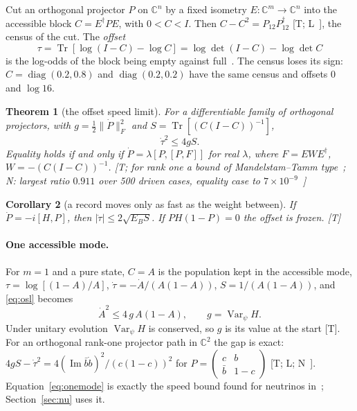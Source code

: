 \documentclass[11pt]{article}
\newtheorem{theorem}{Theorem}
\newtheorem{corollary}[theorem]{Corollary}
\theoremstyle{definition}
\newcommand{\grade}[1]{\textsf{\small[#1]}}
\newcommand{\Tr}{\operatorname{Tr}}
\newcommand{\Var}{\operatorname{Var}}
\newcommand{\F}[1]{\lVert #1\rVert_F}
\begin{document}
Cut an orthogonal projector $P$ on $\mathbb C^n$ by a fixed isometry $E:\mathbb C^m\to\mathbb C^n$ into the accessible block $C=E^\dagger PE$, with $0<C<I$. Then $C-C^2=P_{12}P_{12}^\dagger$ \grade{T; L~\cite{LKL}}, the census of the cut. The \emph{offset}
\begin{equation}\label{eq:offset}
\tau=\Tr[\log(I-C)-\log C]=\log\det(I-C)-\log\det C
\end{equation}
is the log-odds of the block being empty against full~\cite{OBB}. The census loses its sign: $C=\operatorname{diag}(0.2,0.8)$ and $\operatorname{diag}(0.2,0.2)$ have the same census and offsets $0$ and $\log16$.

\begin{theorem}[the offset speed limit]\label{thm:osl}
For a differentiable family of orthogonal projectors, with $g=\tfrac12\F{\dot P}^2$ and $S=\Tr[(C(I-C))^{-1}]$,
\begin{equation}\label{eq:osl}
\dot\tau^2\le4gS .
\end{equation}
Equality holds if and only if $\dot P=\lambda[P,[P,F]]$ for real $\lambda$, where $F=EWE^\dagger$, $W=-(C(I-C))^{-1}$. \grade{T; for rank one a bound of Mandelstam--Tamm type~\cite{MT}; N: largest ratio $0.911$ over 500 driven cases, equality case to $7\times10^{-9}$~\cite{OSL}}
\end{theorem}

\begin{corollary}[a record moves only as fast as the weight between]\label{cor:record}
If $\dot P=-i[H,P]$, then $|\dot\tau|\le2\sqrt{E_BS}$. If $PH(1-P)=0$ the offset is frozen. \grade{T}
\end{corollary}

\paragraph{One accessible mode.} For $m=1$ and a pure state, $C=A$ is the population kept in the accessible mode, $\tau=\log[(1-A)/A]$, $\dot\tau=-\dot A/(A(1-A))$, $S=1/(A(1-A))$, and \eqref{eq:osl} becomes
\begin{equation}\label{eq:onemode}
\dot A^2\le4\,g\,A(1-A),\qquad g=\Var_\psi H .
\end{equation}
Under unitary evolution $\Var_\psi H$ is conserved, so $g$ is its value at the start \grade{T}. For an orthogonal rank-one projector path in $\mathbb C^2$ the gap is exact: $4gS-\dot\tau^2=4(\operatorname{Im}\bar b\dot b)^2/(c(1-c))^2$ for $P=\begin{pmatrix}c&b\\\bar b&1-c\end{pmatrix}$ \grade{T; L; N~\cite{OSL}}. Equation~\eqref{eq:onemode} is exactly the speed bound found for neutrinos in~\cite{NL}; Section~\ref{sec:nu} uses it.
\end{document}
